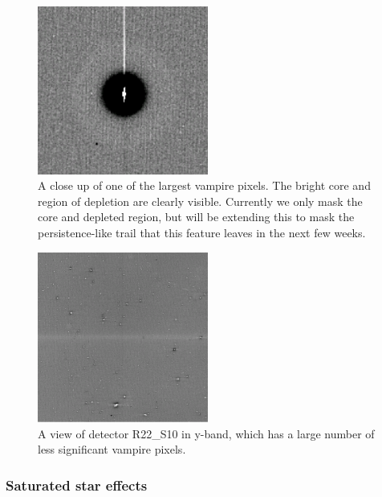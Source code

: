 \begin{figure}
  \begin{center}
  \includegraphics[width=0.5\textwidth]{figures/isr-f03-vampire_pixel.png}
  \caption{A close up of one of the largest vampire pixels.  The bright core and region of depletion are clearly visible.  Currently we only mask the core and depleted region, but will be extending this to mask the persistence-like trail that this feature leaves in the next few weeks.}
  \end{center}
\end{figure}

\begin{figure}
  \begin{center}
  \includegraphics[width=0.5\textwidth]{figures/isr-f04-vampire_pixels_y_det03.png}
  \caption{A view of detector R22\_S10 in y-band, which has a large number of less significant vampire pixels.}
  \end{center}
\end{figure}


\subsubsection{Saturated star effects}

